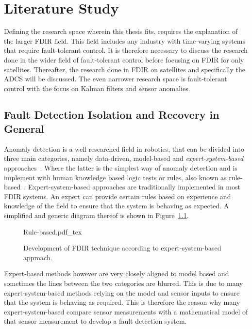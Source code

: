 \chapter{Literature Study}
\label{chap:Literature Study}

Defining the research space wherein this thesis fits, requires the explanation of the larger FDIR field. This field includes any industry with time-varying systems that require fault-tolerant control. It is therefore necessary to discuss the research done in the wider field of fault-tolerant control before focusing on FDIR for only satellites. Thereafter, the research done in FDIR on satellites and specifically the ADCS will be discussed. The even narrower research space is fault-tolerant control with the focus on Kalman filters and sensor anomalies.

\section{Fault Detection Isolation and Recovery in General}
Anomaly detection is a well researched field in robotics, that can be divided into three main categories, namely data-driven, model-based and \emph{expert-system-based} approaches~\cite{Gao2015, Pilastre2020}. Where the latter is the simplest way of anomaly detection and is implement with human knowledge based logic tests or rules, also known as rule-based~\cite{Systems1993, sobhani2009fault}. Expert-system-based approaches are traditionally implemented in most FDIR systems. An expert can provide certain rules based on experience and knowledge of the field to ensure that the system is behaving as expected. A simplified and generic diagram thereof is shown in Figure~\ref{fig:expert-based}.

\begin{figure}[h!t!b]
	\centering
	\def\svgwidth{16cm}
	{Rule-based.pdf_tex}
	\caption{Development of FDIR technique according to expert-system-based approach.}
	\label{fig:expert-based}
\end{figure}

Expert-based methods however are very closely aligned to model based and sometimes the lines between the two categories are blurred. This is due to many expert-system-based methods relying on the model and sensor inputs to ensure that the system is behaving as required. This is therefore the reason why many expert-system-based compare sensor measurements with a mathematical model of that sensor measurement to develop a fault detection system.

